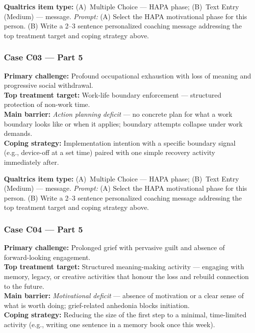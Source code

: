 \documentclass[11pt,a4paper]{article}
\newcommand{\haparesponse}[1]{\begin{tcolorbox}[colback=ResponseBG,colframe=GoldAmber,boxrule=0.6pt,arc=1.5mm,left=6pt,right=6pt,top=5pt,bottom=5pt]\small\textbf{\color{GoldAmber}Qualtrics item type:} (A)~Multiple Choice --- HAPA phase; (B)~Text Entry (Medium) --- message. \quad \textit{Prompt:} #1\end{tcolorbox}}
\begin{document}
\haparesponse{(A) Select the HAPA motivational phase for this person. (B) Write a 2--3 sentence personalized coaching message addressing the top treatment target and coping strategy above.}

\vspace{0.4em}

\subsubsection*{Case C03 --- Part 5}

\begin{contextbox}
\small
\textbf{Primary challenge:} Profound occupational exhaustion with loss of meaning and progressive social withdrawal.\\
\textbf{Top treatment target:} Work-life boundary enforcement --- structured protection of non-work time.\\
\textbf{Main barrier:} \textit{Action planning deficit} --- no concrete plan for what a work boundary looks like or when it applies; boundary attempts collapse under work demands.\\
\textbf{Coping strategy:} Implementation intention with a specific boundary signal (e.g., device-off at a set time) paired with one simple recovery activity immediately after.
\end{contextbox}

\haparesponse{(A) Select the HAPA motivational phase for this person. (B) Write a 2--3 sentence personalized coaching message addressing the top treatment target and coping strategy above.}

\vspace{0.4em}

\subsubsection*{Case C04 --- Part 5}

\begin{contextbox}
\small
\textbf{Primary challenge:} Prolonged grief with pervasive guilt and absence of forward-looking engagement.\\
\textbf{Top treatment target:} Structured meaning-making activity --- engaging with memory, legacy, or creative activities that honour the loss and rebuild connection to the future.\\
\textbf{Main barrier:} \textit{Motivational deficit} --- absence of motivation or a clear sense of what is worth doing; grief-related anhedonia blocks initiation.\\
\textbf{Coping strategy:} Reducing the size of the first step to a minimal, time-limited activity (e.g., writing one sentence in a memory book once this week).
\end{contextbox}
\end{document}
